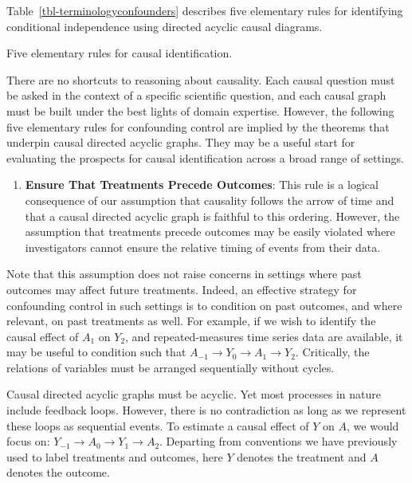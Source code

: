 \documentclass[
  single column]{article}
\providecommand{\tightlist}{%
  \setlength{\itemsep}{0pt}\setlength{\parskip}{0pt}}\usepackage{longtable,booktabs,array}
\begin{document}
Table~\ref{tbl-terminologyconfounders} describes five elementary rules
for identifying conditional independence using directed acyclic causal
diagrams.

\begin{table}

\caption{\label{tbl-terminologyconfounders}Five elementary rules for
causal identification.}

\centering{

\terminologyelconfounders

}

\end{table}%

There are no shortcuts to reasoning about causality. Each causal
question must be asked in the context of a specific scientific question,
and each causal graph must be built under the best lights of domain
expertise. However, the following five elementary rules for confounding
control are implied by the theorems that underpin causal directed
acyclic graphs. They may be a useful start for evaluating the prospects
for causal identification across a broad range of settings.

\begin{enumerate}
\def\labelenumi{\arabic{enumi}.}
\tightlist
\item
  \textbf{Ensure That Treatments Precede Outcomes}: This rule is a
  logical consequence of our assumption that causality follows the arrow
  of time and that a causal directed acyclic graph is faithful to this
  ordering. However, the assumption that treatments precede outcomes may
  be easily violated where investigators cannot ensure the relative
  timing of events from their data.
\end{enumerate}

Note that this assumption does not raise concerns in settings where past
outcomes may affect future treatments. Indeed, an effective strategy for
confounding control in such settings is to condition on past outcomes,
and where relevant, on past treatments as well. For example, if we wish
to identify the causal effect of \(A_1\) on \(Y_2\), and
repeated-measures time series data are available, it may be useful to
condition such that
\(\boxed{A_{-1}} \to \boxed{Y_0} \to A_1 \rightarrow Y_2\). Critically,
the relations of variables must be arranged sequentially without cycles.

Causal directed acyclic graphs must be acyclic. Yet most processes in
nature include feedback loops. However, there is no contradiction as
long as we represent these loops as sequential events. To estimate a
causal effect of \(Y\) on \(A\), we would focus on:
\(\boxed{Y_{-1}} \to \boxed{A_0} \to Y_1 \rightarrow A_2\). Departing
from conventions we have previously used to label treatments and
outcomes, here \(Y\) denotes the treatment and \(A\) denotes the
outcome.
\end{document}
